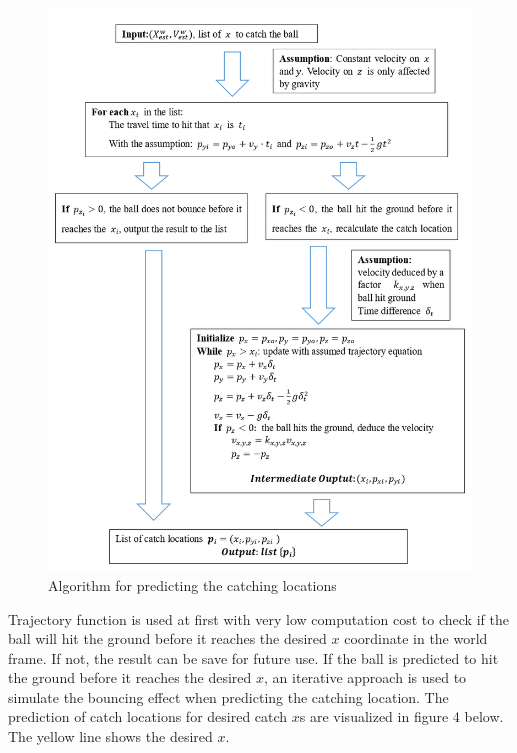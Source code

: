 \documentclass[a4paper]{article}
\begin{document}
\begin{figure}[h]
\centering
\includegraphics[scale=1]{PredCatch.PNG}
\caption{Algorithm for predicting the catching locations}
\end{figure}
Trajectory function is used at first with very low computation cost to check if the ball will hit the ground before it reaches the desired $x$ coordinate in the world frame. If not, the result can be save for future use. If the ball is predicted to hit the ground before it reaches the desired $x$, an iterative approach is used to simulate the bouncing effect when predicting the catching location. The prediction of catch locations for desired catch $x$s are visualized in figure 4 below. The yellow line shows the desired $x$.
\\ 
\end{document}

